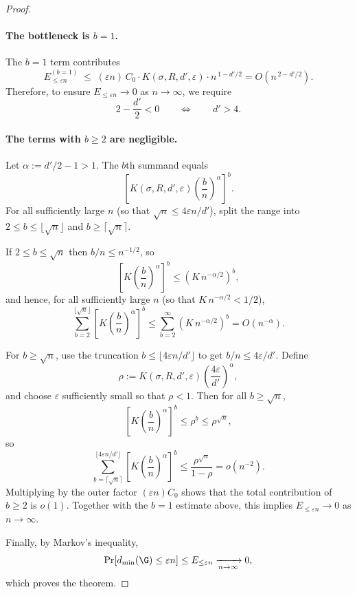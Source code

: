 \begin{proof}
\paragraph{The bottleneck is $b=1$.}
The $b=1$ term contributes
\[
E_{\le \varepsilon n}^{(b=1)}
\;\le\;
(\varepsilon n)\,C_0\cdot K(\sigma,R,d',\varepsilon)\cdot n^{\,1-d'/2}
=
O\!\left(n^{\,2-d'/2}\right).
\]
Therefore, to ensure $E_{\le \varepsilon n}\to 0$ as $n\to\infty$, we require
\[
2-\frac{d'}{2}<0
\qquad\Longleftrightarrow\qquad
d'>4.
\]

\paragraph{The terms with $b\ge 2$ are negligible.}
Let $\alpha:=d'/2-1>1$. The $b$th summand equals
\[
\left[K(\sigma,R,d',\varepsilon)\left(\frac{b}{n}\right)^{\alpha}\right]^b.
\]
For all sufficiently large $n$ (so that $\sqrt{n}\le 4\varepsilon n/d'$), split the range into
$2\le b\le \lfloor \sqrt{n}\rfloor$ and $b\ge \lceil \sqrt{n}\rceil$.

If $2\le b\le \sqrt{n}$ then $b/n\le n^{-1/2}$, so
\[
\left[K\left(\frac{b}{n}\right)^{\alpha}\right]^b
\le
\left(K\,n^{-\alpha/2}\right)^b,
\]
and hence, for all sufficiently large $n$ (so that $K\,n^{-\alpha/2}<1/2$),
\[
\sum_{b=2}^{\lfloor \sqrt{n}\rfloor}
\left[K\left(\frac{b}{n}\right)^{\alpha}\right]^b
\le
\sum_{b=2}^{\infty}\left(K\,n^{-\alpha/2}\right)^b
=
O\!\left(n^{-\alpha}\right).
\]

For $b\ge \sqrt{n}$, use the truncation $b\le \lfloor 4\varepsilon n/d'\rfloor$ to get
$b/n\le 4\varepsilon/d'$. Define
\[
\rho:=K(\sigma,R,d',\varepsilon)\left(\frac{4\varepsilon}{d'}\right)^{\alpha},
\]
and choose $\varepsilon$ sufficiently small so that $\rho<1$. Then for all $b\ge \sqrt{n}$,
\[
\left[K\left(\frac{b}{n}\right)^{\alpha}\right]^b \le \rho^b \le \rho^{\sqrt{n}},
\]
so
\[
\sum_{b=\lceil \sqrt{n}\rceil}^{\lfloor 4\varepsilon n/d'\rfloor}
\left[K\left(\frac{b}{n}\right)^{\alpha}\right]^b
\le
\frac{\rho^{\sqrt{n}}}{1-\rho}
=o(n^{-2}).
\]
Multiplying by the outer factor $(\varepsilon n)C_0$ shows that the total contribution of
$b\ge 2$ is $o(1)$. Together with the $b=1$ estimate above, this implies
$E_{\le \varepsilon n}\to 0$ as $n\to\infty$.

\medskip
Finally, by Markov's inequality,
\[
\Pr[d_{\min}(\G)\le \varepsilon n]\le E_{\le \varepsilon n}\xrightarrow[n\to\infty]{}0,
\]
which proves the theorem.


\end{proof}



